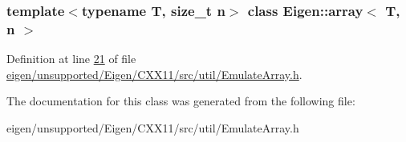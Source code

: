 \subsubsection*{template$<$typename T, size\+\_\+t n$>$\newline
class Eigen\+::array$<$ T, n $>$}



Definition at line \hyperlink{eigen_2unsupported_2_eigen_2_c_x_x11_2src_2util_2_emulate_array_8h_source_l00021}{21} of file \hyperlink{eigen_2unsupported_2_eigen_2_c_x_x11_2src_2util_2_emulate_array_8h_source}{eigen/unsupported/\+Eigen/\+C\+X\+X11/src/util/\+Emulate\+Array.\+h}.



The documentation for this class was generated from the following file\+:\begin{DoxyCompactItemize}
\item 
eigen/unsupported/\+Eigen/\+C\+X\+X11/src/util/\+Emulate\+Array.\+h\end{DoxyCompactItemize}
